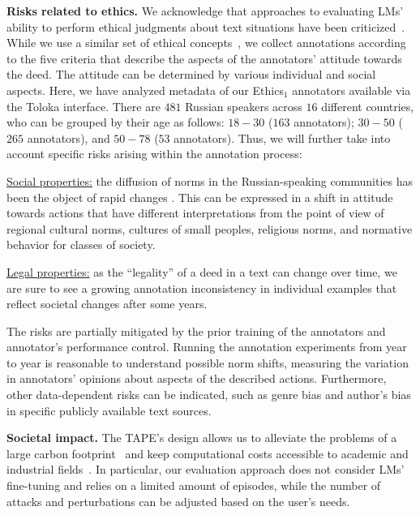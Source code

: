 \documentclass[11pt]{article}
\begin{document}
\noindent \textbf{Risks related to ethics.} We acknowledge that approaches to evaluating LMs' ability to perform ethical judgments about text situations have been criticized~\cite{talat-etal-2022-machine}. While we use a similar set of ethical concepts~\cite{hendrycks2021aligning}, we collect annotations according to the five criteria that describe the aspects of the annotators' attitude towards the deed. The attitude can be determined by various individual and social aspects. Here, we have analyzed metadata of our Ethics$_1$ annotators available via the Toloka interface. There are $481$ Russian speakers across $16$ different countries, who can be grouped by their age as follows: $18-30$ ($163$ annotators); $30-50$ ($265$ annotators), and $50-78$ ($53$ annotators). Thus, we will further take into account specific risks arising within the annotation process:

\noindent \underline{Social properties:} the diffusion of norms in the Russian-speaking communities has been the object of rapid changes \cite{doi:10.1080/13510347.2021.1928078}. This can be expressed in a shift in attitude towards actions that have different interpretations from the point of view of regional cultural norms, cultures of small peoples, religious norms, and normative behavior for classes of society.

\noindent   \underline{Legal properties:} as the ``legality'' of a deed in a text can change over time, we are sure to see a growing annotation inconsistency in individual examples that reflect societal changes after some years.

\noindent The risks are partially mitigated by the prior training of the annotators and annotator's performance control. Running the annotation experiments from year to year is reasonable to understand possible norm shifts, measuring the variation in annotators' opinions about aspects of the described actions. Furthermore, other data-dependent risks can be indicated, such as genre bias and author's bias in specific publicly available text sources.

\noindent \textbf{Societal impact.} The TAPE's design allows us to alleviate the problems of a large carbon footprint~\cite{bender2021dangers} and keep computational costs accessible to academic and industrial fields~\cite{couldry2020costs}. In particular, our evaluation approach does not consider LMs' fine-tuning and relies on a limited amount of episodes, while the number of attacks and perturbations can be adjusted based on the user's needs.  


\end{document}
